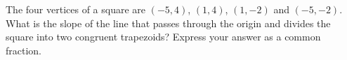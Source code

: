 The four vertices of a square are $(-5,4)$, $(1,4)$, $(1,-2)$ and $(-5,-2)$. What is the slope of the line that passes through the origin and divides the square into two congruent trapezoids? Express your answer as a common fraction.
